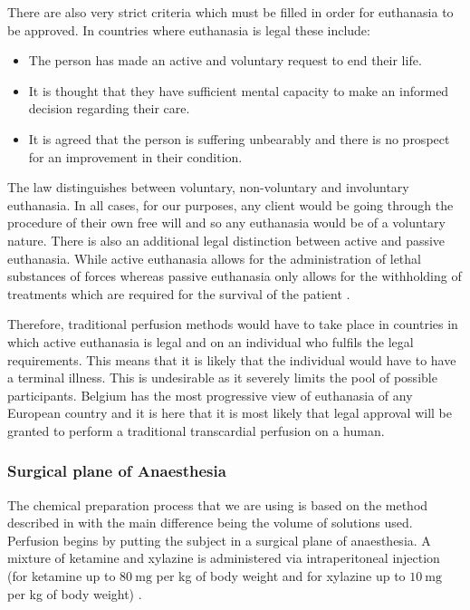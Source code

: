 \documentclass[a4paper, 11pt]{article}
\numberwithin{equation}{section}
\begin{document}
There are also very strict criteria which must be filled in order for euthanasia to be approved. In countries where euthanasia is legal these include:
\begin{itemize}
	\item The person has made an active and voluntary request to end their life.
	\item It is thought that they have sufficient mental capacity to make an informed decision regarding their care.
	\item It is agreed that the person is suffering unbearably and there is no prospect for an improvement in their condition.
\end{itemize} 

The law distinguishes between voluntary, non-voluntary and involuntary euthanasia. In all cases, for our purposes, any client would be going through the procedure of their own free will and so any euthanasia would be of a voluntary nature. There is also an additional legal distinction between active and passive euthanasia. While active euthanasia allows for the administration of lethal substances of forces whereas passive euthanasia only allows for the withholding of treatments which are required for the survival of the patient \cite{rachels1975active}.

Therefore, traditional perfusion methods would have to take place in countries in which active euthanasia is legal and on an individual who fulfils the legal requirements. This means that it is likely that the individual would have to have a terminal illness. This is undesirable as it severely limits the pool of possible participants. Belgium has the most progressive view of euthanasia of any European country and it is here that it is most likely that legal approval will be granted to perform a traditional transcardial perfusion on a human.

\newpage

\clearpage

\pagestyle{alex}

\subsubsection{Surgical plane of Anaesthesia}
	\label{Anaesthesia}


The chemical preparation process that we are using is based on the method described in \cite{Aldehyde_stabilized_cryopreservation} with the main difference being the volume of solutions used. 
Perfusion begins by putting the subject in a surgical plane of anaesthesia. A mixture of ketamine and xylazine is administered via intraperitoneal injection (for ketamine up to $\SI{80}{\milli\gram}$ per kg of body weight and for xylazine up to $\SI{10}{\milli\gram} $ per kg of body weight) \cite{AnimalPerfusion65}. 
\end{document}
